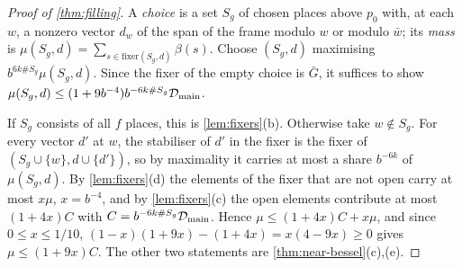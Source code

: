 \begin{proof}[Proof of \cref{thm:filling}]
A \emph{choice} is a set $S_g$ of chosen places above $p_0$ with, at each $w$, a nonzero vector $d_w$ of the span of the frame modulo $w$ or modulo $\bar w$; its \emph{mass} is $\mu(S_g,d)=\sum_{s\in\mathrm{fixer}(S_g,d)}\beta(s)$. Choose $(S_g,d)$ maximising $b^{6k\#S_g}\mu(S_g,d)$. Since the
fixer of the empty choice is $\bar G$, it suffices to show $\mu(S_g,d)\le(1+9b^{-4})b^{-6k\#S_g}\mathcal D_{\rm main}$.

If $S_g$ consists of all $f$ places, this is \cref{lem:fixers}(b). Otherwise take $w\notin S_g$. For every vector $d'$ at $w$, the stabiliser of $d'$ in the fixer is the fixer of $(S_g\cup\{w\},d\cup\{d'\})$, so by maximality it carries at most a share $b^{-6k}$ of $\mu(S_g,d)$. By
\cref{lem:fixers}(d) the elements of the fixer that are not open carry at most $x\mu$, $x=b^{-4}$, and by \cref{lem:fixers}(c) the open elements contribute at most $(1+4x)C$ with $C=b^{-6k\#S_g}\mathcal D_{\rm main}$. Hence $\mu\le(1+4x)C+x\mu$, and since $0\le x\le1/10$,
$(1-x)(1+9x)-(1+4x)=x(4-9x)\ge0$ gives $\mu\le(1+9x)C$. The other two statements are \cref{thm:near-bessel}(c),(e).
\end{proof}

